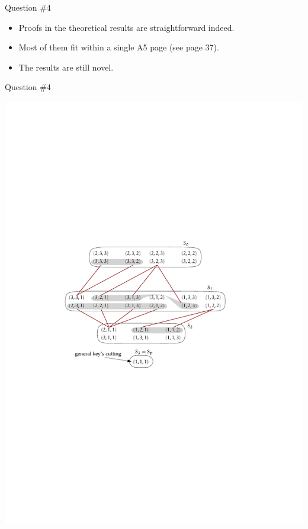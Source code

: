 \begin{frame}{Question \#4}
  \begin{itemize}
    \item Proofs in the theoretical results are straightforward indeed.
    \item Most of them fit within a single A5 page (see page 37).
    \item The results are still novel.
  \end{itemize}
\end{frame}

\begin{frame}{Question \#4}
  \begin{center}
    \includegraphics[height=0.8\textheight]{UpperBoundIllustration.pdf}
  \end{center}
\end{frame}

